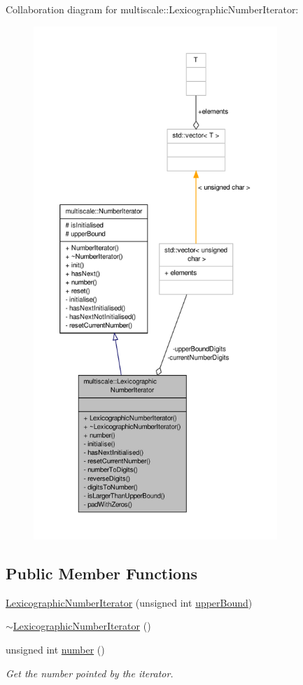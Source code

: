 Collaboration diagram for multiscale\-:\-:Lexicographic\-Number\-Iterator\-:\nopagebreak
\begin{figure}[H]
\begin{center}
\leavevmode
\includegraphics[height=550pt]{classmultiscale_1_1LexicographicNumberIterator__coll__graph}
\end{center}
\end{figure}
\subsection*{Public Member Functions}
\begin{DoxyCompactItemize}
\item 
\hyperlink{classmultiscale_1_1LexicographicNumberIterator_a02a95a6f7876b84909e08555730ff08a}{Lexicographic\-Number\-Iterator} (unsigned int \hyperlink{classmultiscale_1_1NumberIterator_a56a5558958778bbde64e249d67cba886}{upper\-Bound})
\item 
\hyperlink{classmultiscale_1_1LexicographicNumberIterator_affe04d9733b7d0984a5ab3957cb0096a}{$\sim$\-Lexicographic\-Number\-Iterator} ()
\item 
unsigned int \hyperlink{classmultiscale_1_1LexicographicNumberIterator_a282d970d0d1a33d2736bbdf104c18336}{number} ()
\begin{DoxyCompactList}\small\item\em Get the number pointed by the iterator. \end{DoxyCompactList}\end{DoxyCompactItemize}
